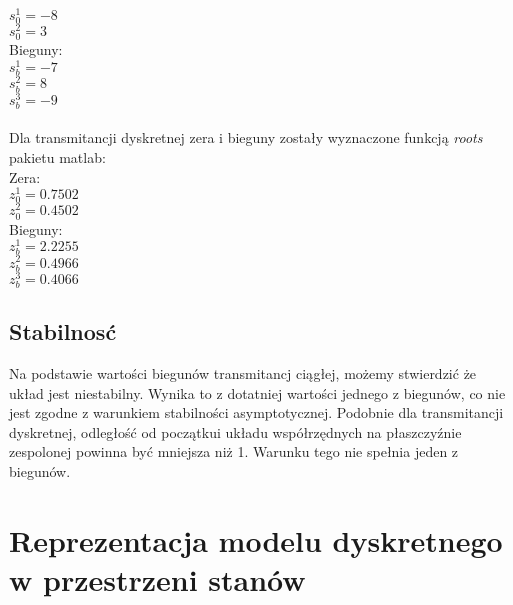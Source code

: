 \documentclass[a4paper, 11pt]{article}
\begin{document}
$s_0^1 = -8$\\

$s_0^2 = 3$\\

\noindent Bieguny: \\

$s_b^1 = -7$\\

$s_b^2 = 8$\\

$s_b^3 = -9$\\
\\
Dla transmitancji dyskretnej zera i bieguny zostały wyznaczone funkcją \emph{roots} pakietu matlab:\\ 
Zera:\\

$z_0^1=0.7502$\\

$z_0^2=0.4502$\\

\noindent Bieguny:\\

$z_b^1 = 2.2255$\\

$z_b^2 =0.4966$\\

$z_b^3 =0.4066$


\subsection{Stabilnosć}
Na podstawie wartości biegunów transmitancj ciągłej, możemy stwierdzić że układ jest niestabilny. Wynika to z dotatniej wartości jednego z biegunów, co nie jest zgodne z warunkiem stabilności asymptotycznej. Podobnie dla transmitancji dyskretnej, odległość od początkui układu współrzędnych na płaszczyźnie zespolonej powinna być mniejsza niż 1. Warunku tego nie spełnia jeden z biegunów. 

\section{Reprezentacja modelu dyskretnego w przestrzeni stanów}
\end{document}
